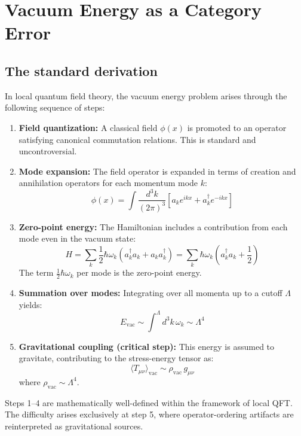 \documentclass[12pt,letterpaper]{article}
\begin{document}
\section{Vacuum Energy as a Category Error}

\subsection{The standard derivation}

In local quantum field theory, the vacuum energy problem arises through the following sequence of steps:

\begin{enumerate}
\item \textbf{Field quantization:} A classical field $\phi(x)$ is promoted to an operator satisfying canonical commutation relations. This is standard and uncontroversial.

\item \textbf{Mode expansion:} The field operator is expanded in terms of creation and annihilation operators for each momentum mode $k$:
\[
\phi(x) = \int \frac{d^3k}{(2\pi)^3} \left[ a_k e^{ikx} + a_k^\dagger e^{-ikx} \right]
\]

\item \textbf{Zero-point energy:} The Hamiltonian includes a contribution from each mode even in the vacuum state:
\[
H = \sum_k \frac{1}{2}\hbar\omega_k (a_k^\dagger a_k + a_k a_k^\dagger) = \sum_k \hbar\omega_k \left(a_k^\dagger a_k + \frac{1}{2}\right)
\]
The term $\frac{1}{2}\hbar\omega_k$ per mode is the zero-point energy.

\item \textbf{Summation over modes:} Integrating over all momenta up to a cutoff $\Lambda$ yields:
\[
E_{\mathrm{vac}} \sim \int^{\Lambda} d^3k \, \omega_k \sim \Lambda^4
\]

\item \textbf{Gravitational coupling (critical step):} This energy is assumed to gravitate, contributing to the stress-energy tensor as:
\[
\langle T_{\mu\nu} \rangle_{\mathrm{vac}} \sim \rho_{\mathrm{vac}} \, g_{\mu\nu}
\]
where $\rho_{\mathrm{vac}} \sim \Lambda^4$.
\end{enumerate}

Steps 1--4 are mathematically well-defined within the framework of local QFT. The difficulty arises exclusively at step 5, where operator-ordering artifacts are reinterpreted as gravitational sources.
\end{document}
